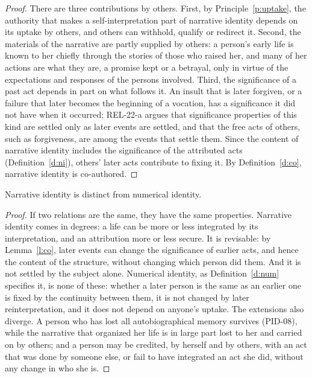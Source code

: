 \documentclass{situationist-preprint}
\begin{document}
\begin{proof}
There are three contributions by others. First, by Principle~\ref{p:uptake}, the authority that makes a self-interpretation part of narrative identity depends on its uptake by others, and others can withhold, qualify or redirect it. Second, the materials of the narrative are partly supplied by others: a person's early life is known to her chiefly through the stories of those who raised her, and many of her actions are what they are, a promise kept or a betrayal, only in virtue of the expectations and responses of the persons involved. Third, the significance of a past act depends in part on what follows it. An insult that is later forgiven, or a failure that later becomes the beginning of a vocation, has a significance it did not have when it occurred; REL-22-a argues that significance properties of this kind are settled only as later events are settled, and that the free acts of others, such as forgiveness, are among the events that settle them. Since the content of narrative identity includes the significance of the attributed acts (Definition~\ref{d:ni}), others' later acts contribute to fixing it. By Definition~\ref{d:co}, narrative identity is co-authored.
\end{proof}

\begin{lemma}\label{l:dist}
Narrative identity is distinct from numerical identity.
\end{lemma}

\begin{proof}
If two relations are the same, they have the same properties. Narrative identity comes in degrees: a life can be more or less integrated by its interpretation, and an attribution more or less secure. It is revisable: by Lemma~\ref{l:co}, later events can change the significance of earlier acts, and hence the content of the structure, without changing which person did them. And it is not settled by the subject alone. Numerical identity, as Definition~\ref{d:num} specifies it, is none of these: whether a later person is the same as an earlier one is fixed by the continuity between them, it is not changed by later reinterpretation, and it does not depend on anyone's uptake. The extensions also diverge. A person who has lost all autobiographical memory survives (PID-08), while the narrative that organized her life is in large part lost to her and carried on by others; and a person may be credited, by herself and by others, with an act that was done by someone else, or fail to have integrated an act she did, without any change in who she is.
\end{proof}
\end{document}
